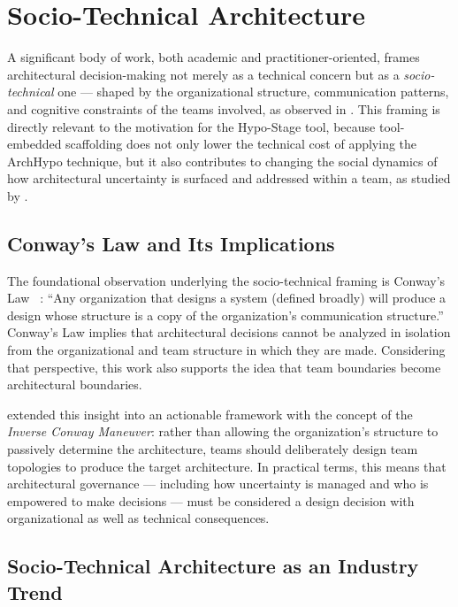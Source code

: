 \section{Socio-Technical Architecture}
\label{sec:sociotechnical}

A significant body of work, both academic and practitioner-oriented, frames
architectural decision-making not merely as a technical concern but as a
\emph{socio-technical} one --- shaped by the organizational structure,
communication patterns, and cognitive constraints of the teams
involved, as observed in \citet{tang2017human, razavian2019empirical, herbsleb1999splitting}.
This framing is directly relevant to the motivation for the Hypo-Stage tool,
because tool-embedded scaffolding does not only lower the technical cost of
applying the ArchHypo technique, but it also contributes to changing the social
dynamics of how architectural uncertainty is surfaced and addressed within a
team, as studied by \citet{borowa2023rationales, razavian2019empirical}.

\subsection{Conway's Law and Its Implications}
\label{subsec:conways-law}

The foundational observation underlying the socio-technical framing is Conway's
Law ~\citep{conway1968}: ``Any organization that designs a system (defined broadly) will
produce a design whose structure is a copy of the organization's communication
structure.'' Conway's Law implies that architectural decisions cannot be analyzed in
isolation from the organizational and team structure in which they are made. Considering that perspective, 
this work also supports the idea that team boundaries become architectural boundaries.

\citet{skelton2019} extended this insight into an actionable framework
with the concept of the \emph{Inverse Conway Maneuver}: rather than allowing the
organization's structure to passively determine the architecture, teams should
deliberately design team topologies to produce the target architecture. In practical
terms, this means that architectural governance --- including how uncertainty is managed
and who is empowered to make decisions --- must be considered a design decision with
organizational as well as technical consequences.

\subsection{Socio-Technical Architecture as an Industry Trend}
\label{subsec:sociotechnical-trend}

